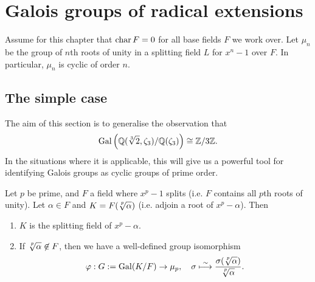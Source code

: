 \chapter{Galois groups of radical extensions}

Assume for this chapter that $\operatorname{char}{{F}} = 0$ for all base fields $F$ we work over. Let $\mu_n$ be the group of $n$th roots of unity in a splitting field $L$ for $x^n - 1$ over $F$. In particular, $\mu_n$ is cyclic of order $n$.

\section{The simple case}

The aim of this section is to generalise the observation that
\[
    \operatorname{Gal}\left(\mathbb{{Q}}(\sqrt[3]{2}, \zeta_3) / \mathbb{{Q}}(\zeta_3)\right) \cong \mathbb{{Z}}/{{3}}\mathbb{{Z}}.
\]
In the situations where it is applicable, this will give us a powerful tool for identifying Galois groups as cyclic groups of prime order.

\begin{proposition}
\label{prop_gal_grp_isom_for_root_of_unity_field}
    Let $p$ be prime, and $F$ a field where $x^p - 1$ splits (i.e. $F$ contains all $p$th roots of unity). Let $\alpha \in F$ and $K = F(\sqrt[\uproot{3} p]{\alpha})$ (i.e. adjoin a root of $x^p - \alpha$). Then
    \begin{enumerate}[label=(\alph*)]
        \item $K$ is the splitting field of $x^p - \alpha$.
        \item If $\sqrt[\uproot{3} p]{\alpha} \not\in F$, then we have a well-defined group isomorphism
        \[
            \varphi: G := \gal(K/F) \to \mu_p, \quad \sigma \isomap \frac{\sigma(\sqrt[\uproot{3} p]{\alpha})}{\sqrt[\uproot{3} p]{\alpha}}.
        \]
    \end{enumerate}
\end{proposition}

